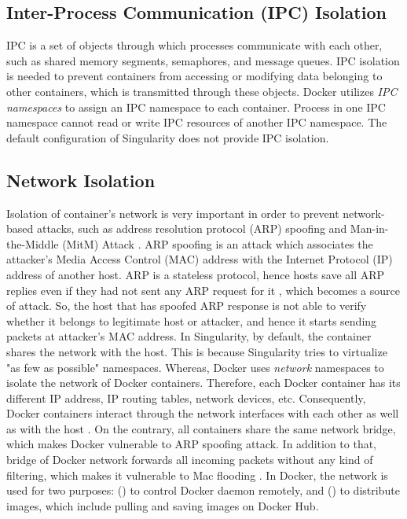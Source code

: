 \subsection{Inter-Process Communication (IPC) Isolation}

IPC is a set of objects through which processes communicate with
each other, such as shared memory segments, semaphores, and message queues.
IPC isolation is needed to prevent containers
from accessing or modifying data belonging to other containers, which is
transmitted through these objects. Docker utilizes \textit{IPC namespaces}
to assign an IPC namespace to each container. Process in one IPC namespace
cannot read or write IPC resources of another IPC namespace.
The default configuration of Singularity does not provide IPC isolation.

\subsection{Network Isolation}

Isolation of container's network is very important in order to prevent
network-based attacks, such as address resolution protocol (ARP)
spoofing and Man-in-the-Middle (MitM) Attack \cite{lockhart2004network}.
ARP spoofing is an attack which associates the attacker's Media Access
Control (MAC) address with the Internet Protocol (IP) address of another host.
ARP is a stateless protocol, hence hosts save all ARP replies even if they had not
sent any ARP request for it \cite{ramachandran2005detecting}, which becomes a
source of attack. So, the host that has spoofed ARP response is not able to
verify whether it belongs to legitimate host or attacker, and hence it starts
sending packets at attacker's MAC address.
In Singularity, by default, the container shares the network with the host.
This is because Singularity tries to virtualize "as few as possible" namespaces.
Whereas, Docker uses \textit{network} namespaces
\cite{NetworkNamespace} to isolate the network of Docker containers.
Therefore, each Docker container has its different IP address,
IP routing tables, network devices, etc. Consequently, Docker containers
interact through the network interfaces with each other as well as with
the host \cite{dockerNetworkdoc}. On the contrary, all containers share
the same network bridge, which makes Docker vulnerable to ARP spoofing attack.
In addition to that, bridge of Docker network forwards all incoming packets
without any kind of filtering, which makes it vulnerable to Mac flooding
\cite{bui2015analysis}.
In Docker, the network is used for two purposes: () to control
Docker daemon remotely, and () to distribute images, which
include pulling and saving images on Docker Hub.

